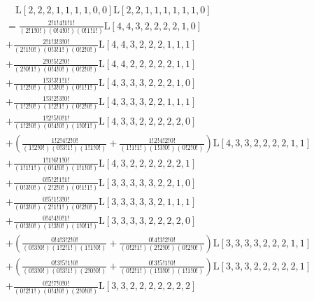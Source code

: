 \begin{equation*} \begin{aligned}
& \quad
  \mathrm{L}[2, 2, 2, 1, 1, 1, 1, 0, 0] %
  \mathrm{L}[2, 2, 1, 1, 1, 1, 1, 1, 0] \\ &= %
  \frac{2!1!4!1!1!}{(2!1!0!)(0!4!0!)(0!1!1!)} \mathrm{L}[4,4,3,2,2,2,2,1,0] \\ &
+ \frac{2!1!3!3!0!}{(2!1!0!)(0!3!1!)(0!2!0!)} \mathrm{L}[4,4,3,2,2,2,1,1,1] \\ &
+ \frac{2!0!5!2!0!}{(2!0!1!)(0!4!0!)(0!2!0!)} \mathrm{L}[4,4,2,2,2,2,2,1,1] \\ &
+ \frac{1!3!3!1!1!}{(1!2!0!)(1!3!0!)(0!1!1!)} \mathrm{L}[4,3,3,3,2,2,2,1,0] \\ &
+ \frac{1!3!2!3!0!}{(1!2!0!)(1!2!1!)(0!2!0!)} \mathrm{L}[4,3,3,3,2,2,1,1,1] \\ &
+ \frac{1!2!5!0!1!}{(1!2!0!)(0!4!0!)(1!0!1!)} \mathrm{L}[4,3,3,2,2,2,2,2,0] \\ &
+ \left(
  \frac{1!2!4!2!0!}{(1!2!0!)(0!3!1!)(1!1!0!)} 
+ \frac{1!2!4!2!0!}{(1!1!1!)(1!3!0!)(0!2!0!)} 
 \right)
  \mathrm{L}[4,3,3,2,2,2,2,1,1] \\ &
+ \frac{1!1!6!1!0!}{(1!1!1!)(0!4!0!)(1!1!0!)} \mathrm{L}[4,3,2,2,2,2,2,2,1] \\ &
+ \frac{0!5!2!1!1!}{(0!3!0!)(2!2!0!)(0!1!1!)} \mathrm{L}[3,3,3,3,3,2,2,1,0] \\ &
+ \frac{0!5!1!3!0!}{(0!3!0!)(2!1!1!)(0!2!0!)} \mathrm{L}[3,3,3,3,3,2,1,1,1] \\ &
+ \frac{0!4!4!0!1!}{(0!3!0!)(1!3!0!)(1!0!1!)} \mathrm{L}[3,3,3,3,2,2,2,2,0] \\ &
+ \left(
  \frac{0!4!3!2!0!}{(0!3!0!)(1!2!1!)(1!1!0!)}
+ \frac{0!4!3!2!0!}{(0!2!1!)(2!2!0!)(0!2!0!)} 
  \right)
  \mathrm{L}[3,3,3,3,2,2,2,1,1] \\ &
+ \left(
  \frac{0!3!5!1!0!}{(0!3!0!)(0!3!1!)(2!0!0!)}
+ \frac{0!3!5!1!0!}{(0!2!1!)(1!3!0!)(1!1!0!)} 
  \right)
  \mathrm{L}[3,3,3,2,2,2,2,2,1] \\ &
+ \frac{0!2!7!0!0!}{(0!2!1!)(0!4!0!)(2!0!0!)} \mathrm{L}[3,3,2,2,2,2,2,2,2] \\
\end{aligned} \end{equation*}
